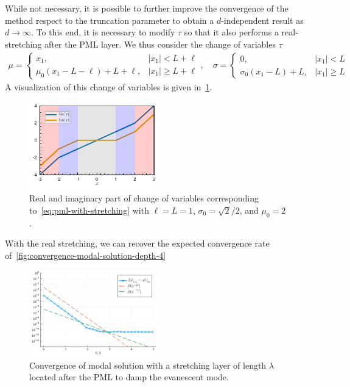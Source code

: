 \documentclass[11pt]{article}
\begin{document}
While not necessary, it is possible to further improve the convergence of the
method respect to the truncation parameter to obtain a $d$-independent result as
$d \to \infty$. To this end, it is necessary to modify $\tau$ so that it also
performs a real-stretching after the PML layer. We thus consider the change
of variables $\tau$
\begin{align}
  \label{eq:pml-with-stretching}  
  \mu = \begin{cases}
    x_1, & |x_1| < L + \ell \\
    \mu_0 (x_1 - L-\ell) + L+\ell, & |x_1| \geq L + \ell
  \end{cases}, \quad
  \sigma = \begin{cases}
    0, & |x_1| < L\\
    \sigma_0 (x_1 - L) + L, & |x_1| \geq L
  \end{cases}
\end{align}
%
A visualization of this change of variables is given
in~\cref{fig:pml-with-stretching}.
\begin{figure}
  \centering
  \includegraphics[width=0.5\textwidth]{figures/pml_real_and_imag.pdf}
  \caption{Real and imaginary part of change of variables corresponding
  to~\cref{eq:pml-with-stretching} with $\ell = L = 1$, $\sigma_0 = \sqrt{2}/2$,
  and $\mu_0 = 2$.}
  \label{fig:pml-with-stretching}
\end{figure}
%

With the real stretching, we can recover the expected convergence rate
of~\cref{fig:convergence-modal-solution-depth-4}
\begin{figure}
  \centering
  \includegraphics[width=0.5\textwidth]{figures/convergence_pml_stretching_planewave_depth_4.pdf}
  \caption{Convergence of modal solution with a stretching layer of length $\lambda$ located after the PML to damp the evanescent mode.}
  \label{fig:pml-convergence-stretching-depth-4}
\end{figure}
\end{document}
